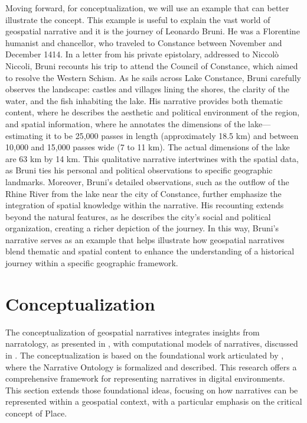 Moving forward, for conceptualization, we will use an example that can better illustrate the concept. This example is useful to explain the vast world of geospatial narrative and it is the journey of Leonardo Bruni. He was a Florentine humanist and chancellor, who traveled to Constance between November and December 1414. In a letter from his private epistolary, addressed to Niccolò Niccoli, Bruni recounts his trip to attend the Council of Constance, which aimed to resolve the Western Schism. As he sails across Lake Constance, Bruni carefully observes the landscape: castles and villages lining the shores, the clarity of the water, and the fish inhabiting the lake. His narrative provides both thematic content, where he describes the aesthetic and political environment of the region, and spatial information, where he annotates the dimensions of the lake—estimating it to be 25,000 passes in length (approximately 18.5 km) and between 10,000 and 15,000 passes wide (7 to 11 km). The actual dimensions of the lake are 63 km by 14 km. This qualitative narrative intertwines with the spatial data, as Bruni ties his personal and political observations to specific geographic landmarks. Moreover, Bruni’s detailed observations, such as the outflow of the Rhine River from the lake near the city of Constance, further emphasize the integration of spatial knowledge within the narrative. His recounting extends beyond the natural features, as he describes the city’s social and political organization, creating a richer depiction of the journey. In this way, Bruni's narrative serves as an example that helps illustrate how geospatial narratives blend thematic and spatial content to enhance the understanding of a historical journey within a specific geographic framework.


\section{Conceptualization}\label{V-sec:conceptualization}

The conceptualization of geospatial narratives integrates insights from narratology, as presented in , with computational models of narratives, discussed in . The conceptualization is based on the foundational work articulated by \cite{meghiniRepresentingNarrativesDigital2021}, where the Narrative Ontology is formalized and described. This research offers a comprehensive framework for representing narratives in digital environments. This section extends those foundational ideas, focusing on how narratives can be represented within a geospatial context, with a particular emphasis on the critical concept of Place.

